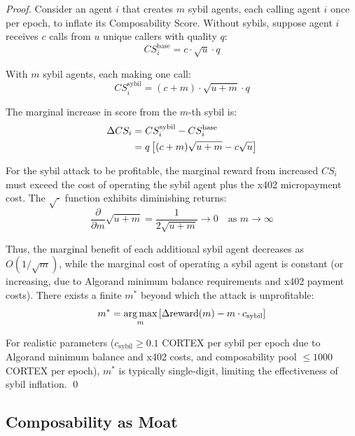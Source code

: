\begin{proof}
Consider an agent $i$ that creates $m$ sybil agents, each calling agent $i$
once per epoch, to inflate its Composability Score. Without sybils, suppose
agent $i$ receives $c$ calls from $u$ unique callers with quality $q$:
\begin{equation}
  CS_i^{\text{base}} = c \cdot \sqrt{u} \cdot q
  \label{eq:cs-base}
\end{equation}

With $m$ sybil agents, each making one call:
\begin{equation}
  CS_i^{\text{sybil}} = (c + m) \cdot \sqrt{u + m} \cdot q
  \label{eq:cs-sybil}
\end{equation}

The marginal increase in score from the $m$-th sybil is:
\begin{align}
  \Delta CS_i &= CS_i^{\text{sybil}} - CS_i^{\text{base}} \notag \\
  &= q \left[(c+m)\sqrt{u+m} - c\sqrt{u}\right]
  \label{eq:delta-cs}
\end{align}

For the sybil attack to be profitable, the marginal reward from increased
$CS_i$ must exceed the cost of operating the sybil agent plus the x402
micropayment cost. The $\sqrt{\cdot}$ function exhibits diminishing returns:
\begin{equation}
  \frac{\partial}{\partial m}\sqrt{u + m} = \frac{1}{2\sqrt{u + m}} \to 0 \quad \text{as } m \to \infty
  \label{eq:sqrt-diminishing}
\end{equation}

Thus, the marginal benefit of each additional sybil agent decreases as
$O(1/\sqrt{m})$, while the marginal cost of operating a sybil agent is
constant (or increasing, due to Algorand minimum balance requirements and x402
payment costs). There exists a finite $m^*$ beyond which the attack is
unprofitable:
\begin{equation}
  m^* = \operatorname*{arg\,max}_m \left[\Delta \text{reward}(m) - m \cdot c_{\text{sybil}}\right]
  \label{eq:m-star}
\end{equation}

For realistic parameters ($c_{\text{sybil}} \geq 0.1$ CORTEX per sybil per
epoch due to Algorand minimum balance and x402 costs, and composability pool
$\leq 1000$ CORTEX per epoch), $m^*$ is typically single-digit, limiting the
effectiveness of sybil inflation. \qed
\end{proof}

\subsection{Composability as Moat}
\label{subsec:comp-moat}

